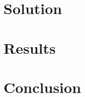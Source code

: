 \documentclass{article}
\begin{document}

\section{Solution}


\section{Results}



\section{Conclusion}
\end{document}
